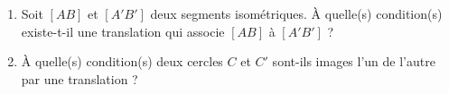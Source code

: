\begin{exercice}[À condition]
\begin{enumerate}
 \item Soit $[AB]$ et $[A'B']$ deux segments isométriques. À quelle(s) condition(s) existe-t-il une translation qui associe $[AB]$ à $[A'B']$ ?
 \item À quelle(s) condition(s) deux cercles $C$ et $C'$ sont-ils images l'un de l'autre par une translation ?
 \end{enumerate}
\end{exercice}


